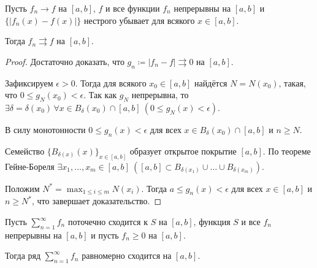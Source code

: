 \begin{theorem}
    Пусть $f_n \rightarrow f$ на $[a, b]$, $f$ и все функции $f_n$ непрерывны на $[a, b]$ и $\{|f_n(x) - f(x)|\}$ нестрого убывает для всякого $x \in [a, b]$.

    Тогда $f_n \rightrightarrows f$ на $[a, b]$.

    \begin{proof}
        Достаточно доказать, что $g_n \coloneqq |f_n - f| \rightrightarrows 0$ на $[a, b]$.

        Зафиксируем $\epsilon > 0$. Тогда для всякого $x_0 \in [a, b]$ найдётся $N = N(x_0)$, такая, что $0 \le g_N(x_0) < \epsilon$. Так как $g_N$ непрерывна, то $\exists \delta = \delta(x_0) \, \forall x \in B_\delta (x_0) \cap [a, b] \ (0 \le g_N(x) < \epsilon)$.

        В силу монотонности $0 \le g_n(x) < \epsilon$ для всех $x \in B_\delta(x_0) \cap [a, b]$ и $n \ge N$.

        Семейство $\{B_{\delta(x)}(x)\}_{x \in [a, b]}$ образует открытое покрытие $[a, b]$. По теореме Гейне-Бореля $\exists x_1, \ldots, x_m \in [a, b] \ ([a, b] \subset B_{\delta(x_1)} \cup \ldots \cup B_{\delta(x_m)})$.

        Положим $N^* = \max_{1 \le i \le m} N(x_i)$. Тогда $a \le g_n(x) < \epsilon$ для всех $x \in [a, b]$ и $n \ge N^*$, что завершает доказательство.
    \end{proof}
\end{theorem}

\begin{corollary}
    Пусть $\sum_{n = 1}^\infty f_n$ поточечно сходится к $S$ на $[a, b]$, функция $S$ и все $f_n$ непрерывны на $[a, b]$ и пусть $f_n \ge 0$ на $[a, b]$.

    Тогда ряд $\sum_{n = 1}^\infty f_n$ равномерно сходится на $[a, b]$.
\end{corollary}

